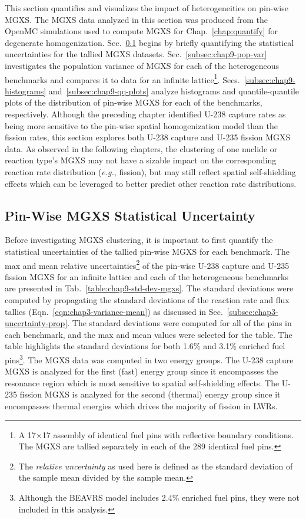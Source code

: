 This section quantifies and visualizes the impact of heterogeneities on pin-wise \ac{MGXS}. The \ac{MGXS} data analyzed in this section was produced from the OpenMC simulations used to compute \ac{MGXS} for Chap.~\ref{chap:quantify} for degenerate homogenization. Sec.~\ref{subsec:chap9-mgxs-uncertainty} begins by briefly quantifying the statistical uncertainties for the tallied \ac{MGXS} datasets. Sec.~\ref{subsec:chap9-pop-var} investigates the population variance of \ac{MGXS} for each of the heterogeneous benchmarks and compares it to data for an infinite lattice\footnote{A 17$\times$17 assembly of identical fuel pins with reflective boundary conditions. The \ac{MGXS} are tallied separately in each of the 289 identical fuel pins.}. Secs.~\ref{subsec:chap9-histograms} and~\ref{subsec:chap9-qq-plots} analyze histograms and quantile-quantile plots of the distribution of pin-wise \ac{MGXS} for each of the benchmarks, respectively. Although the preceding chapter identified U-238 capture rates as being more sensitive to the pin-wise spatial homogenization model than the fission rates, this section explores both U-238 capture and U-235 fission \ac{MGXS} data. As observed in the following chapters, the clustering of one nuclide or reaction type's \ac{MGXS} may not have a sizable impact on the corresponding reaction rate distribution (\textit{e.g.}, fission), but may still reflect spatial self-shielding effects which can be leveraged to better predict other reaction rate distributions.

\subsection{Pin-Wise MGXS Statistical Uncertainty}
\label{subsec:chap9-mgxs-uncertainty}

Before investigating \ac{MGXS} clustering, it is important to first quantify the statistical uncertainties of the tallied pin-wise \ac{MGXS} for each benchmark. The max and mean relative uncertainties\footnote{The \textit{relative uncertainty} as used here is defined as the standard deviation of the sample mean divided by the sample mean.} of the pin-wise U-238 capture and U-235 fission \ac{MGXS} for an infinite lattice and each of the heterogeneous benchmarks are presented in Tab.~\ref{table:chap9-std-dev-mgxs}. The standard deviations were computed by propagating the standard deviations of the reaction rate and flux tallies (Eqn.~\ref{eqn:chap3-variance-mean}) as discussed in Sec.~\ref{subsec:chap3-uncertainty-prop}. The standard deviations were computed for all of the pins in each benchmark, and the max and mean values were selected for the table. The table highlights the standard deviations for both 1.6\% and 3.1\% enriched fuel pins\footnote{Although the \ac{BEAVRS} model includes 2.4\% enriched fuel pins, they were not included in this analysis.}. The \ac{MGXS} data was computed in two energy groups. The U-238 capture \ac{MGXS} is analyzed for the first (fast) energy group since it encompasses the resonance region which is most sensitive to spatial self-shielding effects. The U-235 fission \ac{MGXS} is analyzed for the second (thermal) energy group since it encompasses thermal energies which drives the majority of fission in \acp{LWR}.

